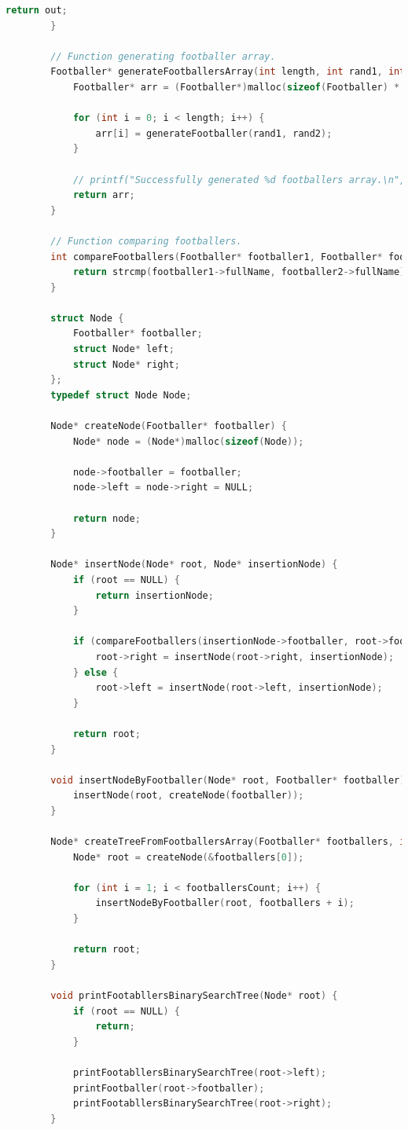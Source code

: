 \documentclass[12pt]{article}
\begin{document}
\begin{lstlisting}[language=C]
			return out;
		}
		
		// Function generating footballer array.
		Footballer* generateFootballersArray(int length, int rand1, int rand2) {
			Footballer* arr = (Footballer*)malloc(sizeof(Footballer) * length);
			
			for (int i = 0; i < length; i++) {
				arr[i] = generateFootballer(rand1, rand2);
			}
			
			// printf("Successfully generated %d footballers array.\n", length);
			return arr;
		}
		
		// Function comparing footballers.
		int compareFootballers(Footballer* footballer1, Footballer* footballer2, int direction) {
			return strcmp(footballer1->fullName, footballer2->fullName);
		}
		
		struct Node {
			Footballer* footballer;
			struct Node* left;
			struct Node* right;
		};
		typedef struct Node Node;
		
		Node* createNode(Footballer* footballer) {
			Node* node = (Node*)malloc(sizeof(Node));
			
			node->footballer = footballer;
			node->left = node->right = NULL;
			
			return node;
		}
		
		Node* insertNode(Node* root, Node* insertionNode) {
			if (root == NULL) {
				return insertionNode;
			}
			
			if (compareFootballers(insertionNode->footballer, root->footballer, 1) >= 0) {
				root->right = insertNode(root->right, insertionNode);
			} else {
				root->left = insertNode(root->left, insertionNode);
			}
			
			return root;
		}
		
		void insertNodeByFootballer(Node* root, Footballer* footballer) {
			insertNode(root, createNode(footballer));
		}
		
		Node* createTreeFromFootballersArray(Footballer* footballers, int footballersCount) {
			Node* root = createNode(&footballers[0]);
			
			for (int i = 1; i < footballersCount; i++) {
				insertNodeByFootballer(root, footballers + i);
			}
			
			return root;
		}
		
		void printFootabllersBinarySearchTree(Node* root) {
			if (root == NULL) {
				return;
			}
			
			printFootabllersBinarySearchTree(root->left);
			printFootballer(root->footballer);
			printFootabllersBinarySearchTree(root->right);
		}
		

\end{lstlisting}
\end{document}
